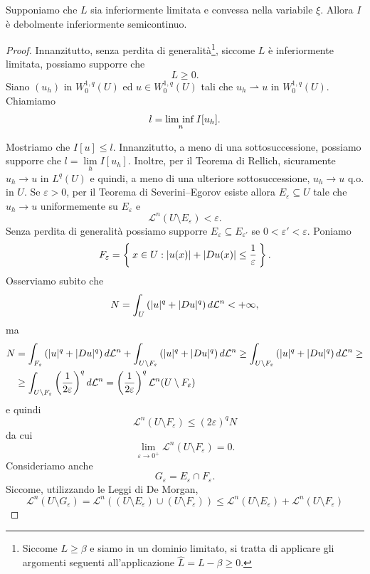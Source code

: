 \begin{teorema}
	Supponiamo che $L$ sia inferiormente limitata e convessa nella variabile $\xi$. Allora $I$ è debolmente inferiormente semicontinuo.
\end{teorema}
\begin{proof}
	Innanzitutto, senza perdita di generalità\footnote{Siccome $L \ge \beta$ e siamo in un dominio limitato, si tratta di applicare gli argomenti seguenti all'applicazione $\hat{L}= L - \beta \ge 0$.}, siccome $L$ è inferiormente limitata, possiamo supporre che 
	\[ L \ge 0. \]
	Siano $(u_h)$ in $W^{1,q}_0(U)$ ed $u \in W^{1,q}_0(U)$ tali che $u_h \rightharpoonup u$ in $W^{1,q}_0(U)$. Chiamiamo 
	\[ l = \underset{n}{\textup{lim inf}\;} I[u_h]. \]
	
	Mostriamo che $I[u] \le l.$ Innanzitutto, a meno di una sottosuccessione, possiamo supporre che $l = \lim\limits_{h} I[u_h]$. Inoltre, per il Teorema di Rellich, sicuramente $u_h \to u$ in $L^q(U)$ e quindi, a meno di una ulteriore sottosuccessione, $u_h \to u $ q.o. in $U$. Se $\varepsilon >0$, per il Teorema di Severini--Egorov esiste allora $E_{\varepsilon} \subseteq U$ tale che $u_h \to u$ uniformemente su $E_{\varepsilon}$ e 
	\[ \mathcal{L}^n(U\setminus E_\varepsilon) < \varepsilon. \]
	Senza perdita di generalità possiamo supporre $E_\varepsilon \subseteq E_{\varepsilon'}$ se $0 < \varepsilon' < \varepsilon$. Poniamo 
	\[ F_\varepsilon = \Set{x \in U : \lvert u(x)\rvert+\lvert Du(x)\rvert\le \frac{1}{\varepsilon}}. \]
	Osserviamo subito che 
	\[ N= \int_U \left( \lvert u\rvert^q + \lvert Du\rvert^q\right) d\mathcal{L}^n < +\infty,  \]
	ma 
	\begin{align*}
		N &= \int_{F_\varepsilon}\left( \lvert u\rvert^q + \lvert Du\rvert^q\right) d\mathcal{L}^n + \int_{U\setminus F_\varepsilon}\left( \lvert u\rvert^q + \lvert Du\rvert^q\right) d\mathcal{L}^n \ge \int_{U\setminus F_\varepsilon}\left( \lvert u\rvert^q + \lvert Du\rvert^q\right) d\mathcal{L}^n \ge \\
		&\ge \int_{U\setminus F_\varepsilon} \left( \frac{1}{2\varepsilon}\right) ^q d\mathcal{L}^n = \left( \frac{1}{2\varepsilon}\right) ^q \mathcal{L}^n(U\setminus F_\varepsilon)
	\end{align*}
	e quindi 
	\[ \mathcal{L}^n(U\setminus F_\varepsilon)  \le (2\varepsilon)^q N \]
	da cui
	\[ \lim\limits_{\varepsilon \to 0^+} \mathcal{L}^n(U\setminus F_\varepsilon)  = 0. \]
	Consideriamo anche 
	\[ G_\varepsilon = E_\varepsilon \cap F_\varepsilon. \]
	Siccome, utilizzando le Leggi di De Morgan,
	\[ \mathcal{L}^n(U\setminus G_\varepsilon) = \mathcal{L}^n((U\setminus E_\varepsilon) \cup (U\setminus F_\varepsilon)) \le \mathcal{L}^n(U\setminus E_\varepsilon) + \mathcal{L}^n(U\setminus F_\varepsilon) \]

\end{proof}

